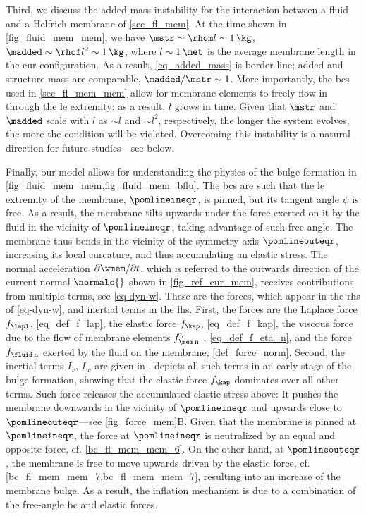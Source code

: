 Third, we discuss  the added-mass instability for the interaction between a fluid and a Helfrich membrane of \cref{sec_fl_mem}. At the  time shown in  \cref{fig_fluid_mem_mem}, we have $\mstr \sim \rhom l \sim 1 \, \kg$, $\madded \sim \rhof  l^2 \sim 1 \, \kg$, where $l \sim 1 \, \met$ is the average  membrane length in the \acl{cur} configuration.
As a result,  \cref{eq_added_mass} is  border line; added and structure mass are comparable,   $\madded/\mstr \sim 1$. More importantly,   the \aclp{bc} used in \cref{sec_fl_mem_mem} allow for  membrane elements to freely flow in through the \acl{le} extremity: as a result,  $l$ grows in time.
Given that  $\mstr$ and $\madded$ scale with $l$ as $\sim l$ and $\sim l^2$, respectively, the longer the system evolves, the more the condition  will be violated. Overcoming this instability is a natural direction for future studies---see below.

Finally, our model allows for understanding  the physics of the bulge formation in \cref{fig_fluid_mem_mem,fig_fluid_mem_bflu}.
The \acp{bc} \crefs{\bcsmembrane} are such that the \acl{le} extremity of the  membrane, $\pomlineineqr$, is pinned, but its tangent angle $\psi$ is free. As a result, the  membrane tilts upwards under the force exerted on it by the fluid in the vicinity of $\pomlineineqr$, taking advantage of such free angle. The membrane thus bends in the vicinity of the symmetry axis $\pomlineouteqr$, increasing its local curcature, and thus accumulating an elastic stress.
The normal acceleration $\partial \wmem/\partial t$, which is referred to the outwards direction of the current normal $\normalc{}$ shown in  \cref{fig_ref_cur_mem}, receives contributions from multiple terms, see \cref{eq-dyn-w}. These are the forces, which appear in the \acl{rhs} of \cref{eq-dyn-w}, and inertial terms in the \acl{lhs}. First, the forces are the Laplace force $f_\lapl$, \cref{eq_def_f_lap}, the elastic force $f_\kap$, \cref{eq_def_f_kap}, the viscous force due to the flow of membrane elements $\fetamemn$ \cite{al-izziShearDrivenInstabilitiesMembrane2020}, \cref{eq_def_f_eta_n}, and the force $\fflun$ exerted by the fluid on the membrane, \cref{def_force_norm}. Second, the  inertial terms $I_v$, $I_w$ are given in .
 depicts all such terms in an early stage of the bulge formation, showing that the elastic force $f_\kap$ dominates over all other terms. Such force releases the accumulated elastic stress above: It pushes the membrane downwards in the vicinity of $\pomlineineqr$ and upwards close to $\pomlineouteqr$---see \cref{fig_force_mem}B. Given that the membrane is pinned at $\pomlineineqr$, the force at $\pomlineineqr$ is neutralized by an equal and opposite force, cf. \cref{bc_fl_mem_mem_6}. On the other hand, at $\pomlineouteqr$, the membrane is free to move upwards driven by the elastic force, cf. \cref{bc_fl_mem_mem_7,bc_fl_mem_mem_7}, resulting into an increase of the membrane bulge.
As a result, the inflation mechanism is due to a combination of the free-angle \ac{bc} and elastic forces.


